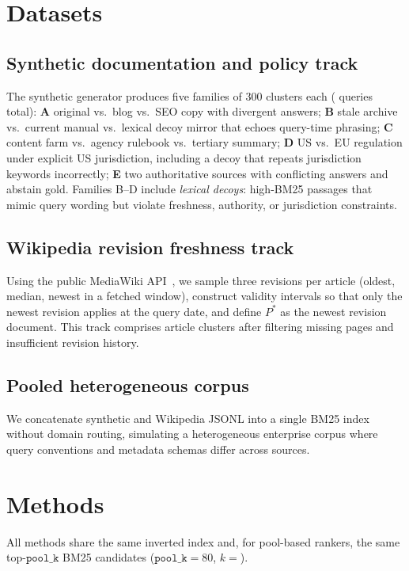 \documentclass[sigconf,anonymous,review]{acmart}
\begin{document}
\section{Datasets}
\label{sec:data}

\subsection{Synthetic documentation and policy track}
The synthetic generator produces five families of 300 clusters each (\ProvBenchNumQueries{} queries total):
\textbf{A} original vs.\ blog vs.\ SEO copy with divergent answers;
\textbf{B} stale archive vs.\ current manual vs.\ lexical decoy mirror that echoes query-time phrasing;
\textbf{C} content farm vs.\ agency rulebook vs.\ tertiary summary;
\textbf{D} US vs.\ EU regulation under explicit US jurisdiction, including a decoy that repeats jurisdiction keywords incorrectly;
\textbf{E} two authoritative sources with conflicting answers and abstain gold.
Families B--D include \emph{lexical decoys}: high-BM25 passages that mimic query wording but violate freshness, authority, or jurisdiction constraints.

\subsection{Wikipedia revision freshness track}
Using the public MediaWiki API~\cite{wiki_api}, we sample three revisions per article (oldest, median, newest in a fetched window), construct validity intervals so that only the newest revision applies at the query date, and define $P^\ast$ as the newest revision document.
This track comprises \WikiNumQueries{} article clusters after filtering missing pages and insufficient revision history.

\subsection{Pooled heterogeneous corpus}
We concatenate synthetic and Wikipedia JSONL into a single BM25 index without domain routing, simulating a heterogeneous enterprise corpus where query conventions and metadata schemas differ across sources.

\section{Methods}
\label{sec:methods}

All methods share the same inverted index and, for pool-based rankers, the same top-$\texttt{pool\_k}$ BM25 candidates ($\texttt{pool\_k}{=}80$, $k{=}$\ProvBenchK{}).
\end{document}

